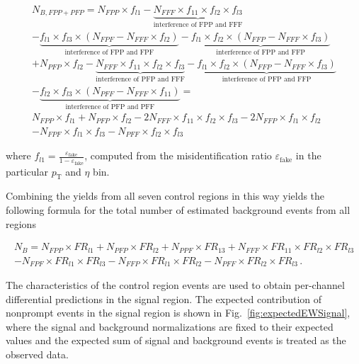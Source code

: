 \begin{multline*}
N_{B,FPP + PFP} = N_{FPP} \times f_{l1}
  - \underbrace{N_{FFF} \times f_{11} \times f_{l2} \times f_{l3}}_{\textrm{interference of FPP and FFF}} \\
  - \underbrace{f_{l1} \times f_{l3} \times (N_{FPF} - N_{FFF} \times f_{l2} )}_{\textrm{interference of FPP and FPF}}
- \underbrace{f_{l1} \times f_{l2} \times (N_{FFP} - N_{FFF} \times f_{l3})}_{\textrm{interference of FPP and FFP}}\\
 + N_{PFP} \times f_{l2} -  \underbrace{N_{FFF} \times f_{11} \times f_{l2} \times f_{l3}}_{\textrm{interference of PFP and FFF}}
 - \underbrace{f_{l1} \times f_{l2} \times (N_{FFP} - N_{FFF}  \times f_{l3})}_{\textrm{interference of PFP and FFP}}\\
  - \underbrace{f_{l2} \times f_{l3} \times (N_{PFF} -  N_{FFF} \times f_{11} )}_{\textrm{interference of PFP and PFF}} = \\
  N_{FPP} \times f_{l1} +  N_{PFP} \times f_{l2} - 2 N_{FFF} \times f_{11} \times f_{l2} \times f_{l3}
   - 2 N_{FFP} \times f_{l1} \times f_{l2} \\ - N_{FPF} \times f_{l1} \times f_{l3} -  N_{PFF} \times f_{l2} \times f_{l3}
\end{multline*}

where $f_{l1} = \frac{\varepsilon_{\text{fake}}}{1 - \varepsilon_{\text{fake}}}$, 
computed from the misidentification ratio $\varepsilon_{\text{fake}}$ in the 
particular $p_{\text{T}}$ and $\eta$ bin.

Combining the yields from all seven control regions in this way yields the following formula
for the total number of estimated background events from all regions 

\begin{align*}
N_B = N_{FPP} \times FR_{l1} + N_{PFP} \times FR_{l2} + N_{PPF} \times FR_{13} 
 + N_{FFF} \times FR_{11} \times FR_{l2} \times FR_{l3}  \\
- N_{FPF} \times FR_{l1} \times FR_{l3} - N_{FFP} \times FR_{l1} \times FR_{l2} - N_{PFF} \times FR_{l2} \times FR_{l3} \,.
\label{eqn:fakerate}
\end{align*}

The characteristics of the control region events
are used to obtain per-channel differential predictions in the signal region.
The expected contribution of nonprompt events in the signal region is shown
in Fig.~\ref{fig:expectedEWSignal}, where the signal and background 
normalizations are fixed to their expected
values and the expected sum of signal and background events is treated as the 
observed data.

